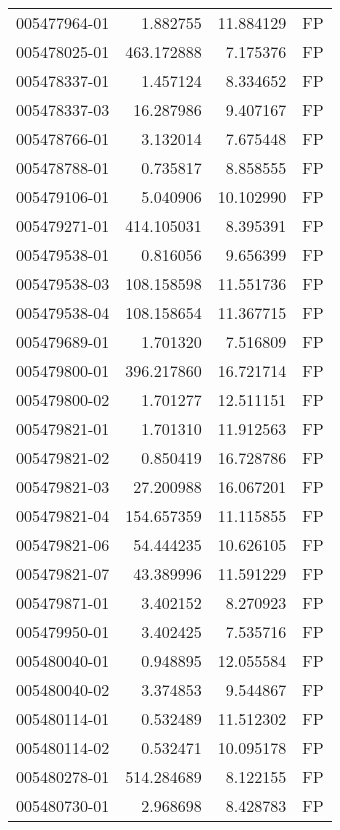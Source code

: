 \begin{tabular}{lrrl}
005477964-01 &    1.882755 &      11.884129 &   FP \\
005478025-01 &  463.172888 &       7.175376 &   FP \\
005478337-01 &    1.457124 &       8.334652 &   FP \\
005478337-03 &   16.287986 &       9.407167 &   FP \\
005478766-01 &    3.132014 &       7.675448 &   FP \\
005478788-01 &    0.735817 &       8.858555 &   FP \\
005479106-01 &    5.040906 &      10.102990 &   FP \\
005479271-01 &  414.105031 &       8.395391 &   FP \\
005479538-01 &    0.816056 &       9.656399 &   FP \\
005479538-03 &  108.158598 &      11.551736 &   FP \\
005479538-04 &  108.158654 &      11.367715 &   FP \\
005479689-01 &    1.701320 &       7.516809 &   FP \\
005479800-01 &  396.217860 &      16.721714 &   FP \\
005479800-02 &    1.701277 &      12.511151 &   FP \\
005479821-01 &    1.701310 &      11.912563 &   FP \\
005479821-02 &    0.850419 &      16.728786 &   FP \\
005479821-03 &   27.200988 &      16.067201 &   FP \\
005479821-04 &  154.657359 &      11.115855 &   FP \\
005479821-06 &   54.444235 &      10.626105 &   FP \\
005479821-07 &   43.389996 &      11.591229 &   FP \\
005479871-01 &    3.402152 &       8.270923 &   FP \\
005479950-01 &    3.402425 &       7.535716 &   FP \\
005480040-01 &    0.948895 &      12.055584 &   FP \\
005480040-02 &    3.374853 &       9.544867 &   FP \\
005480114-01 &    0.532489 &      11.512302 &   FP \\
005480114-02 &    0.532471 &      10.095178 &   FP \\
005480278-01 &  514.284689 &       8.122155 &   FP \\
005480730-01 &    2.968698 &       8.428783 &   FP \\

\end{tabular}
